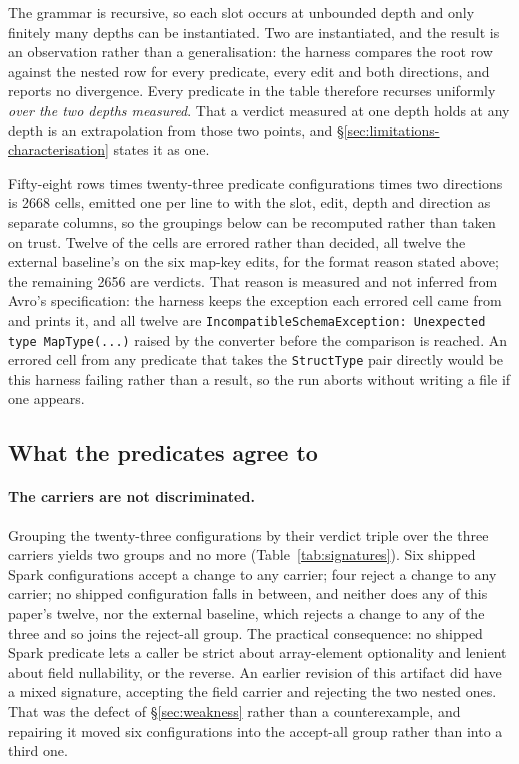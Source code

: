 The grammar is recursive, so each slot occurs at unbounded depth and only finitely many depths can be instantiated. Two are instantiated, and the result is an observation rather than a generalisation: the harness compares the root row against the nested row for every predicate, every edit and both directions, and reports no divergence. Every predicate in the table therefore recurses uniformly \emph{over the two depths measured}. That a verdict measured at one depth holds at any depth is an extrapolation from those two points, and \S\ref{sec:limitations-characterisation} states it as one.

Fifty-eight rows times twenty-three predicate configurations times two directions is 2668 cells, emitted one per line to  with the slot, edit, depth and direction as separate columns, so the groupings below can be recomputed rather than taken on trust. Twelve of the cells are errored rather than decided, all twelve the external baseline's on the six map-key edits, for the format reason stated above; the remaining 2656 are verdicts. That reason is measured and not inferred from Avro's specification: the harness keeps the exception each errored cell came from and prints it, and all twelve are \texttt{IncompatibleSchemaException: Unexpected type MapType(...)} raised by the converter before the comparison is reached. An errored cell from any predicate that takes the \texttt{StructType} pair directly would be this harness failing rather than a result, so the run aborts without writing a file if one appears.

\subsection{What the predicates agree to}

\paragraph{The carriers are not discriminated.} Grouping the twenty-three configurations by their verdict triple over the three carriers yields two groups and no more (Table~\ref{tab:signatures}). Six shipped Spark configurations accept a change to any carrier; four reject a change to any carrier; no shipped configuration falls in between, and neither does any of this paper's twelve, nor the external baseline, which rejects a change to any of the three and so joins the reject-all group. The practical consequence: no shipped Spark predicate lets a caller be strict about array-element optionality and lenient about field nullability, or the reverse. An earlier revision of this artifact did have a mixed signature, accepting the field carrier and rejecting the two nested ones. That was the defect of \S\ref{sec:weakness} rather than a counterexample, and repairing it moved six configurations into the accept-all group rather than into a third one.

